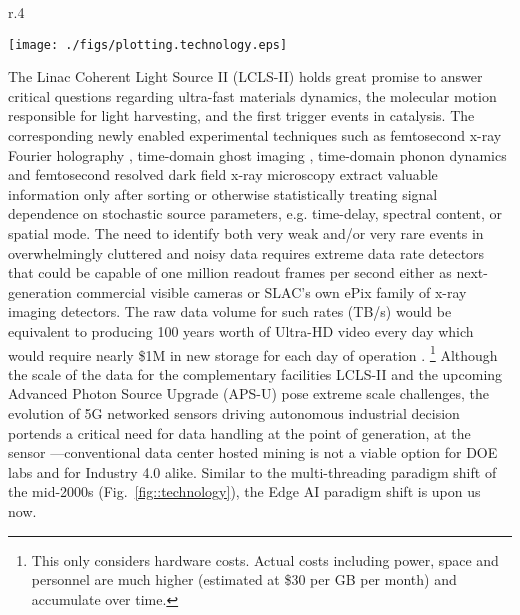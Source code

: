 \documentclass{article}
\begin{document}
\begin{wrapfigure}[23]{r}{.4\linewidth}
	\vspace{-1.5\baselineskip}
	\centerline{ \texttt{[image: ./figs/plotting.technology.eps]} }
	\vspace{-1\baselineskip}
	\caption{
		\label{fig::technology} 
		Adapted from Ref.~\cite{MicroprocessorTrendData}. Note that the limitations in the mid-2000s triggered the multi-threading paradigm.
	}
\end{wrapfigure}
The Linac Coherent Light Source II (LCLS-II) holds great promise to answer critical questions regarding ultra-fast materials dynamics, the molecular motion responsible for light harvesting, and the first trigger events in catalysis. 
The corresponding newly enabled experimental techniques such as femtosecond x-ray Fourier holography \cite{Tais2018}, time-domain ghost imaging \cite{Taran2020}, time-domain phonon dynamics \cite{Mariano2013,Abbamonte2013} and femtosecond resolved dark field x-ray microscopy \cite{Simons2015} extract valuable information only after sorting or otherwise statistically treating signal dependence on stochastic source parameters, e.g. time-delay, spectral content, or spatial mode.
The need to identify both very weak and/or very rare events in overwhelmingly cluttered and noisy data requires extreme data rate detectors that could be capable of one million readout frames per second either as next-generation commercial visible cameras or SLAC's own ePix family of x-ray imaging detectors. 
The raw data volume for such rates (TB/s) would be equivalent to producing 100 years worth of Ultra-HD video \cite{HowBigVideo} every day which would require nearly \$1M in new storage for each day of operation \cite{CostPerTB}.
\footnote{This only considers hardware costs. Actual costs including power, space and personnel are much higher (estimated at \$30 per GB per month) and accumulate over time.} 
Although the scale of the data for the complementary facilities LCLS-II and the upcoming Advanced Photon Source Upgrade (APS-U) pose extreme scale challenges, the evolution of 5G networked sensors driving autonomous industrial decision portends a critical need for data handling at the point of generation, at the sensor \cite{Gartner2018,NetworkWorld2019}---conventional data center hosted mining is not a viable option for DOE labs and for Industry 4.0 alike.
Similar to the multi-threading paradigm shift of the mid-2000s (Fig.~\ref{fig::technology}), the Edge AI paradigm shift is upon us now.
\end{document}
